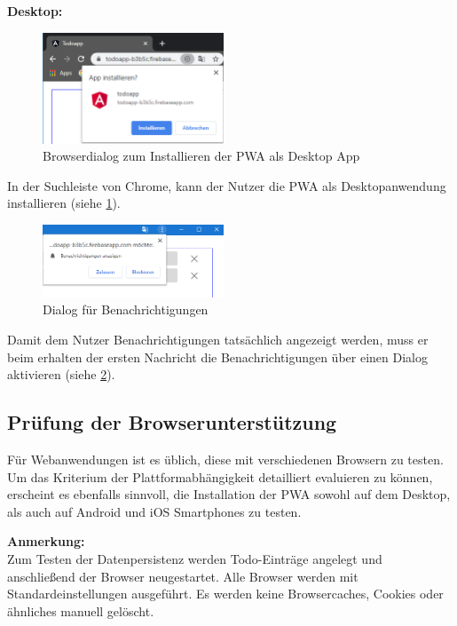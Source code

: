 \textbf{Desktop:}
\begin{figure}
	\vspace{-10pt}
	\includegraphics[width=0.48\textwidth]{img/add_to_desktop_2.PNG}
	\caption{Browserdialog zum Installieren der PWA als Desktop App}
	\label{fig:dialog_install_pwa_mobile}
	\vspace{-10pt}
\end{figure}
In der Suchleiste von Chrome, kann der Nutzer die PWA als Desktopanwendung installieren (siehe \ref{fig:dialog_install_pwa_mobile}).
\begin{figure}
	\vspace{-10pt}
	\includegraphics[width=0.48\textwidth]{img/berechtigungen_zulassen.PNG}
	\centering
	\caption{Dialog für Benachrichtigungen}
	\label{fig:pwa_benachrichtigungen_zulassen}
	\vspace{-10pt}
\end{figure}
Damit dem Nutzer Benachrichtigungen tatsächlich angezeigt werden, muss er beim erhalten der ersten Nachricht die Benachrichtigungen über einen Dialog aktivieren (siehe \ref{fig:pwa_benachrichtigungen_zulassen}).

\subsection{Prüfung der Browserunterstützung}
Für Webanwendungen ist es üblich, diese mit verschiedenen Browsern zu testen. Um das Kriterium der Plattformabhängigkeit detailliert evaluieren zu können, erscheint es ebenfalls sinnvoll, die Installation der PWA sowohl auf dem Desktop, als auch auf Android und iOS Smartphones zu testen.

\textbf{Anmerkung:}\\
Zum Testen der Datenpersistenz werden Todo-Einträge angelegt und anschließend der Browser neugestartet.
Alle Browser werden mit Standardeinstellungen ausgeführt. Es werden keine Browsercaches, Cookies oder ähnliches manuell gelöscht.

